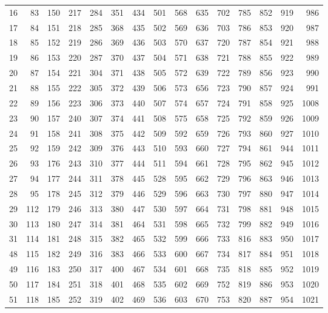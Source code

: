 \documentclass{assignment}
\begin{document}
\begin{tabular}{r r r r r r r r r r r r r r r}
16 & 83 & 150 & 217 & 284 & 351 & 434 & 501 & 568 & 635 & 702 & 785 & 852 & 919 & 986 \\
17 & 84 & 151 & 218 & 285 & 368 & 435 & 502 & 569 & 636 & 703 & 786 & 853 & 920 & 987 \\
18 & 85 & 152 & 219 & 286 & 369 & 436 & 503 & 570 & 637 & 720 & 787 & 854 & 921 & 988 \\
19 & 86 & 153 & 220 & 287 & 370 & 437 & 504 & 571 & 638 & 721 & 788 & 855 & 922 & 989 \\
20 & 87 & 154 & 221 & 304 & 371 & 438 & 505 & 572 & 639 & 722 & 789 & 856 & 923 & 990 \\
21 & 88 & 155 & 222 & 305 & 372 & 439 & 506 & 573 & 656 & 723 & 790 & 857 & 924 & 991 \\
22 & 89 & 156 & 223 & 306 & 373 & 440 & 507 & 574 & 657 & 724 & 791 & 858 & 925 & 1008 \\
23 & 90 & 157 & 240 & 307 & 374 & 441 & 508 & 575 & 658 & 725 & 792 & 859 & 926 & 1009 \\
24 & 91 & 158 & 241 & 308 & 375 & 442 & 509 & 592 & 659 & 726 & 793 & 860 & 927 & 1010 \\
25 & 92 & 159 & 242 & 309 & 376 & 443 & 510 & 593 & 660 & 727 & 794 & 861 & 944 & 1011 \\
26 & 93 & 176 & 243 & 310 & 377 & 444 & 511 & 594 & 661 & 728 & 795 & 862 & 945 & 1012 \\
27 & 94 & 177 & 244 & 311 & 378 & 445 & 528 & 595 & 662 & 729 & 796 & 863 & 946 & 1013 \\
28 & 95 & 178 & 245 & 312 & 379 & 446 & 529 & 596 & 663 & 730 & 797 & 880 & 947 & 1014 \\
29 & 112 & 179 & 246 & 313 & 380 & 447 & 530 & 597 & 664 & 731 & 798 & 881 & 948 & 1015 \\
30 & 113 & 180 & 247 & 314 & 381 & 464 & 531 & 598 & 665 & 732 & 799 & 882 & 949 & 1016 \\
31 & 114 & 181 & 248 & 315 & 382 & 465 & 532 & 599 & 666 & 733 & 816 & 883 & 950 & 1017 \\
48 & 115 & 182 & 249 & 316 & 383 & 466 & 533 & 600 & 667 & 734 & 817 & 884 & 951 & 1018 \\
49 & 116 & 183 & 250 & 317 & 400 & 467 & 534 & 601 & 668 & 735 & 818 & 885 & 952 & 1019 \\
50 & 117 & 184 & 251 & 318 & 401 & 468 & 535 & 602 & 669 & 752 & 819 & 886 & 953 & 1020 \\
51 & 118 & 185 & 252 & 319 & 402 & 469 & 536 & 603 & 670 & 753 & 820 & 887 & 954 & 1021 \\

\end{tabular}
\end{document}
